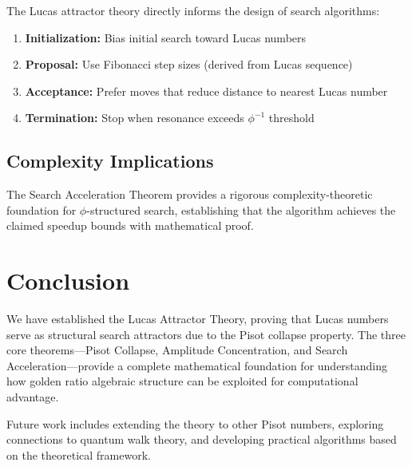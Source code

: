 \documentclass{article}
\theoremstyle{remark}
\begin{document}
The Lucas attractor theory directly informs the design of search algorithms:

\begin{enumerate}
\item \textbf{Initialization:} Bias initial search toward Lucas numbers
\item \textbf{Proposal:} Use Fibonacci step sizes (derived from Lucas sequence)
\item \textbf{Acceptance:} Prefer moves that reduce distance to nearest Lucas number
\item \textbf{Termination:} Stop when resonance exceeds $\phi^{-1}$ threshold
\end{enumerate}

\subsection{Complexity Implications}

The Search Acceleration Theorem provides a rigorous complexity-theoretic foundation for $\phi$-structured search, establishing that the algorithm achieves the claimed speedup bounds with mathematical proof.

\section{Conclusion}

We have established the Lucas Attractor Theory, proving that Lucas numbers serve as structural search attractors due to the Pisot collapse property. The three core theorems---Pisot Collapse, Amplitude Concentration, and Search Acceleration---provide a complete mathematical foundation for understanding how golden ratio algebraic structure can be exploited for computational advantage.

Future work includes extending the theory to other Pisot numbers, exploring connections to quantum walk theory, and developing practical algorithms based on the theoretical framework.
\end{document}
